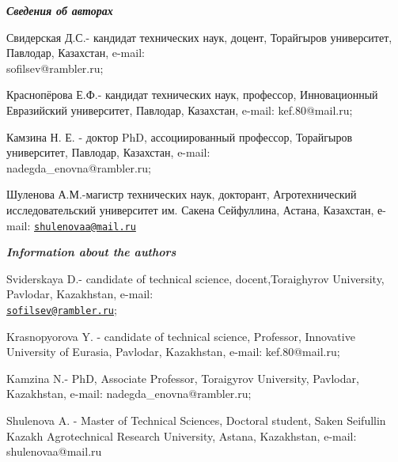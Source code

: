 \begin{authorinfo}
\emph{{\bfseries Сведения об авторах}}

Свидерская Д.С.- кандидат технических наук, доцент, Торайгыров
университет, Павлодар, Казахстан, e-mail: \\sofilsev@rambler.ru;

Краснопёрова Е.Ф.- кандидат технических наук, профессор, Инновационный
Евразийский университет, Павлодар, Казахстан, e-mail: kef.80@mail.ru;

Камзина Н. Е. - доктор PhD, ассоциированный профессор, Торайгыров
университет, Павлодар, Казахстан, e-mail: \\nadegda\_enovna@rambler.ru;

Шуленова А.М.-магистр технических наук, докторант, Агротехнический
исследовательский университет им. Сакена Сейфуллина, Астана, Казахстан,
е-mail: \href{mailto:shulenovaa@mail.ru}{\nolinkurl{shulenovaa@mail.ru}}

\emph{{\bfseries Information about the authors}}

Sviderskaya D.- candidate of technical science, docent,Toraighyrov
University, Pavlodar, Kazakhstan, e-mail:\\
\href{mailto:sofilsev@rambler.ru}{\nolinkurl{sofilsev@rambler.ru}};

Krasnopyorova Y. - candidate of technical science, Professor, Innovative
University of Eurasia, Pavlodar, Kazakhstan, e-mail: kef.80@mail.ru;

Kamzina N.- PhD, Associate Professor, Toraigyrov University, Pavlodar,
Kazakhstan, e-mail: nadegda\_enovna@rambler.ru;

Shulenova A. - Master of Technical Sciences, Doctoral student, Saken
Seifullin Kazakh Agrotechnical Research University, Astana, Kazakhstan,
e-mail: shulenovaa@mail.ru
\end{authorinfo}
